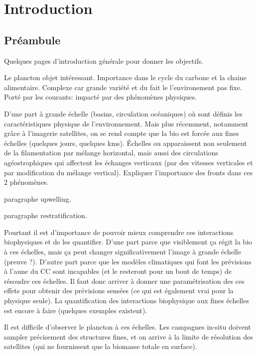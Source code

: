 
\chapter{Introduction}
\addChpLof
\label{chp:introduction}

\minitoc%
\clearpage

\section{Préambule}

Quelques pages d'introduction générale pour donner les objectifs.

Le plancton objet intéressant.
Importance dans le cycle du carbone et la chaine alimentaire.
Complexe car grande variété et du fait le l'environement pas fixe.
Porté par les courants: impacté par des phénomènes physiques.

D'une part à grande échelle (basins, circulation océaniques) où sont définis les caractéristiques physique de l'environnement.
Mais plus récemment, notamment grâce à l'imagerie satellites, on se rend compte que la bio est forcée aux fines échelles (quelques jours, quelques kms). Échelles ou apparaissent non seulement de la filamentation par mélange horizontal, mais aussi des circulations agéostrophiques qui affectent les échanges verticaux (par des vitesses verticales et par modification du mélange vertical).
Expliquer l'importance des fronts dans ces 2 phénomènes.

paragraphe upwelling.

paragraphe restratification.

Pourtant il est d'importance de pouvoir mieux comprendre ces interactions biophysiques et de les quantifier.
D'une part parce que visiblement ça régit la bio à ces échelles, mais ça peut changer significativement l'image à grande échelle (preuve ?).
D'autre part parce que les modèles climatiques qui font les prévisions à l'aune du CC sont incapables (et le resteront pour un bout de temps) de résoudre ces échelles. Il faut donc arriver à donner une paramétrisation des ces effets pour obtenir des prévisions sensées (ce qui est également vrai pour la physique seule).
La quantification des interactions biophysique aux fines échelles est encore à faire (quelques exemples existent).

Il est difficile d'observer le plancton à ces échelles. Les campagnes in-situ doivent sampler précisement des structures fines, et on arrive à la limite de résolution des satellites (qui ne fournissent que la biomasse totale en surface).

